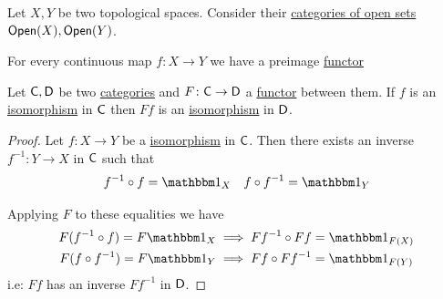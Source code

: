 \documentclass[../../main]{subfiles}
\begin{document}
\begin{example}
  Let \(X, Y\) be two topological spaces.
  Consider their \hyperref[ex:open-set-category]{categories of open sets} \(\mathsf{Open}(X), \mathsf{Open}(Y)\).

  For every continuous map \(f: X \to Y\) we have a preimage \hyperref[def:functor]{functor}
  \begin{center}
  \end{center}
\end{example}

\begin{proposition}
  Let \(\mathsf{C}, \mathsf{D}\) be two \hyperref[def:category]{categories} and \(F\colon \mathsf{C} \to \mathsf{D}\) a \hyperref[def:functor]{functor} between them.
  If \(f\) is an \hyperref[def:categorical-isomorphism]{isomorphism} in \(\mathsf{C}\) then \(Ff\) is an \hyperref[def:categorical-isomorphism]{isomorphism} in \(\mathsf{D}\).
\end{proposition}
\begin{proof}
  Let \(f\colon X \to Y\) be a \hyperref[def:categorical-isomorphism]{isomorphism} in \(\mathsf{C}\).
  Then there exists an inverse \(f^{-1}\colon Y \to X\) in \(\mathsf{C}\) such that
  \begin{equation*}
    f^{-1} \circ f = \id_{X} \quad f \circ f^{-1} = \id_{Y}
  \end{equation*}

  Applying \(F\) to these equalities we have
  \begin{align*}
    F(f^{-1} \circ f) = F\id_{X} &\implies Ff^{-1} \circ Ff = \id_{F(X)} \\
    F(f \circ f^{-1}) = F\id_{Y} &\implies Ff \circ Ff^{-1} = \id_{F(Y)}
  \end{align*}
  i.e: \(Ff\) has an inverse \(Ff^{-1}\) in \(\mathsf{D}\).
\end{proof}
\end{document}
